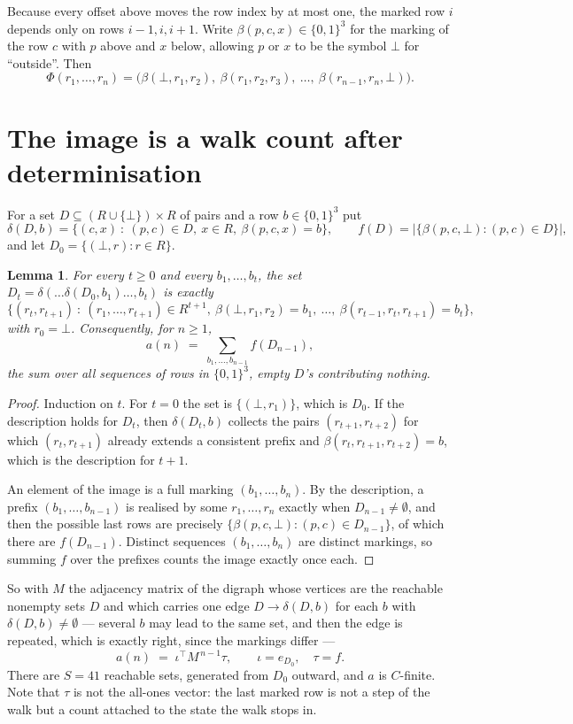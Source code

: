 \documentclass[11pt,a4paper]{article}
\theoremstyle{plain}
\newtheorem{lemma}[theorem]{Lemma}
\theoremstyle{definition}
\begin{document}
Because every offset above moves the row index by at most one, the marked row $i$ depends only
on rows $i-1,i,i+1$. Write $\beta(p,c,x)\in\{0,1\}^{3}$ for the marking of the row $c$
with $p$ above and $x$ below, allowing $p$ or $x$ to be the symbol $\bot$ for ``outside''.
Then
\[
\Phi(r_1,\dots,r_n)=\bigl(\beta(\bot,r_1,r_2),\ \beta(r_1,r_2,r_3),\ \dots,\
\beta(r_{n-1},r_n,\bot)\bigr).
\]

\section{The image is a walk count after determinisation}

For a set $D\subseteq(R\cup\{\bot\})\times R$ of pairs and a row $b\in\{0,1\}^{3}$ put
\[
\delta(D,b)=\{(c,x)\ :\ (p,c)\in D,\ x\in R,\ \beta(p,c,x)=b\},\qquad
f(D)=\bigl|\{\beta(p,c,\bot):(p,c)\in D\}\bigr| ,
\]
and let $D_0=\{(\bot,r):r\in R\}$.

\begin{lemma}\label{lem:det}
For every $t\ge0$ and every $b_1,\dots,b_t$, the set
$D_t=\delta(\dots\delta(D_0,b_1)\dots,b_t)$ is exactly
\[
\{(r_t,r_{t+1})\ :\ (r_1,\dots,r_{t+1})\in R^{t+1},\ \beta(\bot,r_1,r_2)=b_1,\ \dots,\
\beta(r_{t-1},r_t,r_{t+1})=b_t\} ,
\]
with $r_0=\bot$. Consequently, for $n\ge1$,
\[
a(n)\;=\;\sum_{b_1,\dots,b_{n-1}}f(D_{n-1}),
\]
the sum over all sequences of rows in $\{0,1\}^{3}$, empty $D$'s contributing nothing.
\end{lemma}

\begin{proof}
Induction on $t$. For $t=0$ the set is $\{(\bot,r_1)\}$, which is $D_0$. If the description
holds for $D_t$, then $\delta(D_t,b)$ collects the pairs $(r_{t+1},r_{t+2})$ for which
$(r_t,r_{t+1})$ already extends a consistent prefix and
$\beta(r_t,r_{t+1},r_{t+2})=b$, which is the description for $t+1$.

An element of the image is a full marking $(b_1,\dots,b_n)$. By the description, a prefix
$(b_1,\dots,b_{n-1})$ is realised by some $r_1,\dots,r_n$ exactly when $D_{n-1}\neq
\emptyset$, and then the possible last rows are precisely
$\{\beta(p,c,\bot):(p,c)\in D_{n-1}\}$, of which there are $f(D_{n-1})$. Distinct
sequences $(b_1,\dots,b_n)$ are distinct markings, so summing $f$ over the prefixes counts the
image exactly once each.
\end{proof}

So with $M$ the adjacency matrix of the digraph whose vertices are the reachable nonempty sets
$D$ and which carries one edge $D\to\delta(D,b)$ for each $b$ with $\delta(D,b)\neq\emptyset$
--- several $b$ may lead to the same set, and then the edge is repeated, which is exactly
right, since the markings differ ---
\[
a(n)\;=\;\iota^{\!\top}M^{\,n-1}\tau,\qquad \iota=e_{D_0},\quad \tau=f .
\]
There are $S=41$ reachable sets, generated from $D_0$ outward, and $a$ is $C$-finite. Note
that $\tau$ is not the all-ones vector: the last marked row is not a step of the walk but a
count attached to the state the walk stops in.
\end{document}
